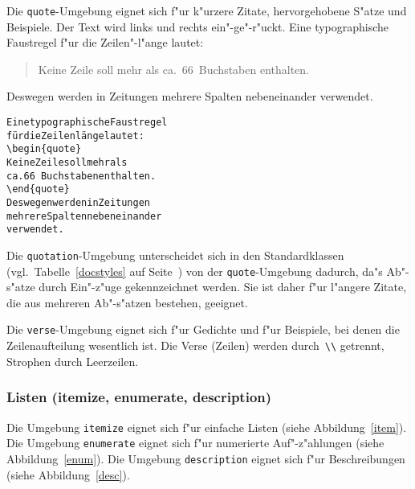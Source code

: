 Die \texttt{quote}-Umgebung eignet sich f"ur k"urzere Zitate,
hervorgehobene S"atze und Beispiele.
Der Text wird links und rechts ein"-ge"-r"uckt.
\exa
Eine typographische Faustregel
f"ur die Zeilen"-l"ange lautet:
\begin{quote}
\relax %
Keine Zeile soll mehr als
ca.\ 66~Buchstaben enthalten.
\end{quote}
Deswegen werden in Zeitungen
mehrere Spalten nebeneinander
verwendet.
\exb 
\begin{alltt}
Eine typographische Faustregel
f\"ur die Zeilenl\"ange lautet:
\verb+\begin{quote}+
Keine Zeile soll mehr als
ca.\bs{} 66~Buchstaben enthalten.
\verb+\end{quote}+
Deswegen werden in Zeitungen
mehrere Spalten nebeneinander
verwendet.
\end{alltt}
\exc

Die \texttt{quotation}-Umgebung unterscheidet sich in den
Standardklassen (vgl.\ Tabelle~\ref{docstyles} auf
Seite~\pageref{docstyles}) von der \texttt{quote}-Umgebung
dadurch, da"s Ab"-s"atze durch Ein"-z"uge gekennzeichnet werden.
Sie ist daher f"ur l"angere Zitate, die aus mehreren Ab"-s"atzen
bestehen, geeignet.

Die \texttt{verse}-Umgebung eignet sich f"ur Gedichte und f"ur
Beispiele, bei denen die Zeilenaufteilung wesentlich ist.  Die
Verse (Zeilen) werden durch~\verb|\\| getrennt, Strophen durch
Leerzeilen.


\subsubsection{Listen (itemize, enumerate, description)}
 
Die Umgebung \texttt{itemize} eignet sich f"ur einfache Listen
(siehe Abbildung~\ref{item}).
Die Umgebung \texttt{enumerate} eignet sich f"ur numerierte
Auf"-z"ahlungen (siehe Abbildung~\ref{enum}).
Die Umgebung \texttt{description} eignet sich f"ur Beschreibungen
(siehe Abbildung~\ref{desc}).

